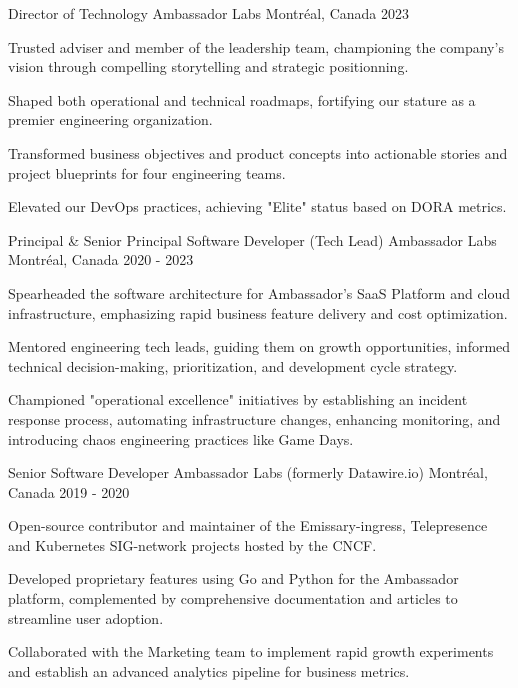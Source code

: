 
\begin{cventries}

  \cventry
    {Director of Technology} %
    {Ambassador Labs} %
    {Montréal, Canada} %
    {2023} %
    {
      \begin{cvitems} %
        \item {Trusted adviser and member of the leadership team, championing the company's vision through compelling storytelling and strategic positionning.}
        \item {Shaped both operational and technical roadmaps, fortifying our stature as a premier engineering organization.}
        \item {Transformed business objectives and product concepts into actionable stories and project blueprints for four engineering teams.}
        \item {Elevated our DevOps practices, achieving "Elite" status based on DORA metrics.}
      \end{cvitems}
    }

  \cventry
    {Principal \& Senior Principal Software Developer (Tech Lead)} %
    {Ambassador Labs} %
    {Montréal, Canada} %
    {2020 - 2023} %
    {
      \begin{cvitems} %
        \item {Spearheaded the software architecture for Ambassador's SaaS Platform and cloud infrastructure, emphasizing rapid business feature delivery and cost optimization.}
        \item {Mentored engineering tech leads, guiding them on growth opportunities, informed technical decision-making, prioritization, and development cycle strategy.}
        \item {Championed "operational excellence" initiatives by establishing an incident response process, automating infrastructure changes, enhancing monitoring, and introducing chaos engineering practices like Game Days.}
      \end{cvitems}
    }

  \cventry
    {Senior Software Developer} %
    {Ambassador Labs (formerly Datawire.io)} %
    {Montréal, Canada} %
    {2019 - 2020} %
    {
      \begin{cvitems} %
        \item {Open-source contributor and maintainer of the Emissary-ingress, Telepresence and Kubernetes SIG-network projects hosted by the CNCF.}
        \item {Developed proprietary features using Go and Python for the Ambassador platform, complemented by comprehensive documentation and articles to streamline user adoption.}
        \item {Collaborated with the Marketing team to implement rapid growth experiments and establish an advanced analytics pipeline for business metrics.}
      \end{cvitems}
    }


\end{cventries}
